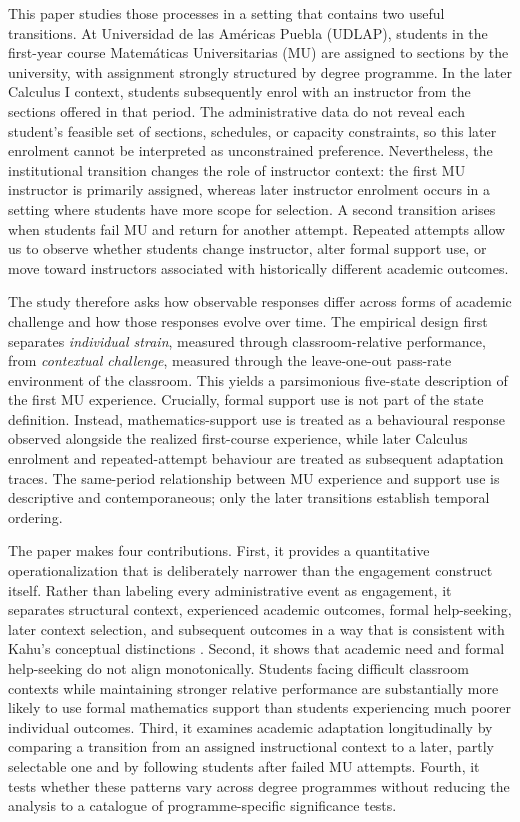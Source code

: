 \documentclass[11pt,a4paper]{article}
\begin{document}
This paper studies those processes in a setting that contains two useful transitions. At Universidad de las Am\'ericas Puebla (UDLAP), students in the first-year course Matem\'aticas Universitarias (MU) are assigned to sections by the university, with assignment strongly structured by degree programme. In the later Calculus I context, students subsequently enrol with an instructor from the sections offered in that period. The administrative data do not reveal each student's feasible set of sections, schedules, or capacity constraints, so this later enrolment cannot be interpreted as unconstrained preference. Nevertheless, the institutional transition changes the role of instructor context: the first MU instructor is primarily assigned, whereas later instructor enrolment occurs in a setting where students have more scope for selection. A second transition arises when students fail MU and return for another attempt. Repeated attempts allow us to observe whether students change instructor, alter formal support use, or move toward instructors associated with historically different academic outcomes.

The study therefore asks how observable responses differ across forms of academic challenge and how those responses evolve over time. The empirical design first separates \emph{individual strain}, measured through classroom-relative performance, from \emph{contextual challenge}, measured through the leave-one-out pass-rate environment of the classroom. This yields a parsimonious five-state description of the first MU experience. Crucially, formal support use is not part of the state definition. Instead, mathematics-support use is treated as a behavioural response observed alongside the realized first-course experience, while later Calculus enrolment and repeated-attempt behaviour are treated as subsequent adaptation traces. The same-period relationship between MU experience and support use is descriptive and contemporaneous; only the later transitions establish temporal ordering.

The paper makes four contributions. First, it provides a quantitative operationalization that is deliberately narrower than the engagement construct itself. Rather than labeling every administrative event as engagement, it separates structural context, experienced academic outcomes, formal help-seeking, later context selection, and subsequent outcomes in a way that is consistent with Kahu's conceptual distinctions \citep{kahu2013}. Second, it shows that academic need and formal help-seeking do not align monotonically. Students facing difficult classroom contexts while maintaining stronger relative performance are substantially more likely to use formal mathematics support than students experiencing much poorer individual outcomes. Third, it examines academic adaptation longitudinally by comparing a transition from an assigned instructional context to a later, partly selectable one and by following students after failed MU attempts. Fourth, it tests whether these patterns vary across degree programmes without reducing the analysis to a catalogue of programme-specific significance tests.
\end{document}
